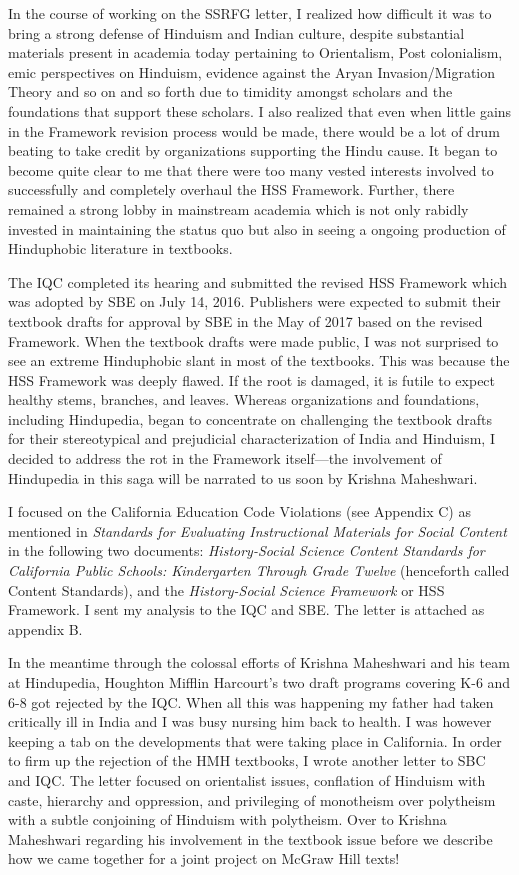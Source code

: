 In the course of working on the SSRFG letter, I realized how difficult it was to bring a strong defense of Hinduism and Indian culture, despite substantial materials present in academia today pertaining to Orientalism, Post colonialism, emic perspectives on Hinduism, evidence against the Aryan Invasion/Migration Theory and so on and so forth due to timidity amongst scholars and the foundations that support these scholars. I also realized that even when little gains in the Framework revision process would be made, there would be a lot of drum beating to take credit by organizations supporting the Hindu cause. It began to become quite clear to me that there were too many vested interests involved to successfully and completely overhaul the HSS Framework. Further, there remained a strong lobby in mainstream academia which is not only rabidly invested in maintaining the status quo but also in seeing a ongoing production of Hinduphobic literature in textbooks. 

The IQC completed its hearing and submitted the revised HSS Framework which was adopted by SBE on July 14, 2016. Publishers were expected to submit their textbook drafts for approval by SBE in the May of 2017 based on the revised Framework. When the textbook drafts were made public, I was not surprised to see an extreme Hinduphobic slant in most of the textbooks. This was because the HSS Framework was deeply flawed. If the root is damaged, it is futile to expect healthy stems, branches, and leaves. Whereas organizations and foundations, including Hindupedia, began to concentrate on challenging the textbook drafts for their stereotypical and prejudicial characterization of India and Hinduism, I decided to address the rot in the Framework itself—the involvement of Hindupedia in this saga will be narrated to us soon by Krishna Maheshwari. 

I focused on the California Education Code Violations (see Appendix C) as mentioned in \textit{Standards for Evaluating Instructional Materials for Social Content} in the following two documents: \textit{History-Social Science Content Standards for California Public Schools: Kindergarten Through Grade Twelve} (henceforth called Content Standards), and the \textit{History-Social Science Framework} or HSS Framework. I sent my analysis to the IQC and SBE. The letter is attached as appendix B. 

In the meantime through the colossal efforts of Krishna Maheshwari and his team at Hindupedia, Houghton Mifflin Harcourt’s two draft programs covering K-6 and 6-8 got rejected by the IQC. When all this was happening my father had taken critically ill in India and I was busy nursing him back to health. I was however keeping a tab on the developments that were taking place in California. In order to firm up the rejection of the HMH textbooks, I wrote another letter to SBC and IQC. The letter focused on orientalist issues, conflation of Hinduism with caste, hierarchy and oppression, and privileging of monotheism over polytheism with a subtle conjoining of Hinduism with polytheism. Over to Krishna Maheshwari regarding his involvement in the textbook issue before we describe how we came together for a joint project on McGraw Hill texts! 


